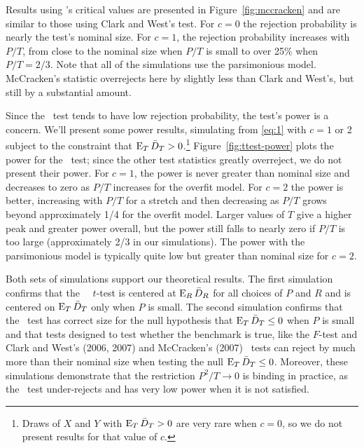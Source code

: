 \documentclass[11pt]{article}
\newcommand{\citepos}[1]{\citeauthor{#1}'s \citeyearpar{#1}}
\begin{document}
Results using \citepos{Mcc:07} critical values are
presented in Figure~\ref{fig:mccracken} and are similar to those using
Clark and West's test.  For $c=0$ the rejection probability is nearly
the test's nominal size.  For $c=1$, the rejection probability
increases with $P/T$, from close to the nominal size when $P/T$ is
small to over 25\% when $P/T = 2/3$.  Note that all of the simulations
use the parsimonious model.  McCracken's statistic overrejects here
by slightly less than Clark and West's, but still by a substantial
amount.

Since the \dmw\ test tends to have low rejection probability, the
test's power is a concern.  We'll present some power results,
simulating from \eqref{eq:1} with $c = 1$ or 2 subject to the
constraint that $\operatorname{E}_T \bar{D}_{T} > 0$.\footnote{Draws of $X$ and $Y$ with
  $\operatorname{E}_T \bar{D}_{T} > 0$ are very rare when $c=0$, so we do not present
  results for that value of $c$.}  Figure~\ref{fig:ttest-power} plots
the power for the \dmw\ test; since the other test statistics greatly
overreject, we do not present their power.  For $c=1$, the power is
never greater than nominal size and decreases to zero as $P/T$
increases for the overfit model.  For $c=2$ the power is better,
increasing with $P/T$ for a stretch and then decreasing as $P/T$ grows
beyond approximately 1/4 for the overfit model.  Larger values of $T$
give a higher peak and greater power overall, but the power still
falls to nearly zero if $P/T$ is too large (approximately 2/3 in our
simulations).  The power with the parsimonious model is typically
quite low but greater than nominal size for $c = 2$.

Both sets of simulations support our theoretical results.  The first
simulation confirms that the \dmw\ \oos\ $t$-test is centered at $\operatorname{E}_R
\bar{D}_{R}$ for all choices of $P$ and $R$ and is centered on $\operatorname{E}_T \bar{D}_{T}$
only when $P$ is small.  The second simulation confirms that the \dmw\
test has correct size for the null hypothesis that $\operatorname{E}_T \bar{D}_{T} \leq 0$
when $P$ is small and that tests designed to test whether the
benchmark is true, like the $F$-test and Clark and West's (2006, 2007)
and McCracken's (2007) \oos\ tests can reject by much more than their
nominal size when testing the null $\operatorname{E}_T \bar{D}_{T} \leq 0$.  Moreover,
these simulations demonstrate that the restriction $P^2/T \to 0$ is
binding in practice, as the \dmw\ test under-rejects and has very low
power when it is not satisfied.
\end{document}
